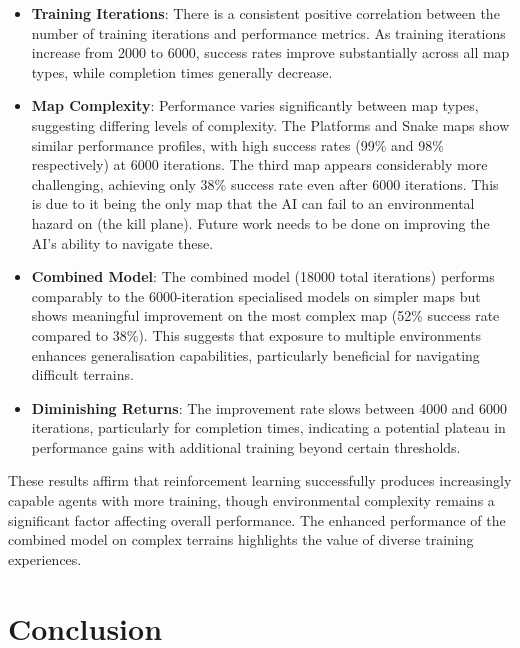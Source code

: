 \begin{itemize}
    \item \textbf{Training Iterations}: There is a consistent positive correlation between the number of training iterations and performance metrics. 
    As training iterations increase from 2000 to 6000, success rates improve substantially across all map types, while completion times generally decrease.

    \item \textbf{Map Complexity}: Performance varies significantly between map types, suggesting differing levels of complexity. 
    The Platforms and Snake maps show similar performance profiles, with high success rates (99\% and 98\% respectively) at 6000 iterations. 
    The third map appears considerably more challenging, achieving only 38\% success rate even after 6000 iterations.
    This is due to it being the only map that the AI can fail to an environmental hazard on (the kill plane).
    Future work needs to be done on improving the AI's ability to navigate these.
    
    \item \textbf{Combined Model}: The combined model (18000 total iterations) performs comparably to the 6000-iteration specialised models on simpler maps but shows meaningful improvement on the most complex map (52\% success rate compared to 38\%). 
    This suggests that exposure to multiple environments enhances generalisation capabilities, particularly beneficial for navigating difficult terrains.
    
    \item \textbf{Diminishing Returns}: The improvement rate slows between 4000 and 6000 iterations, particularly for completion times, indicating a potential plateau in performance gains with additional training beyond certain thresholds.
\end{itemize}

These results affirm that reinforcement learning successfully produces increasingly capable agents with more training, though environmental complexity remains a significant factor affecting overall performance. 
The enhanced performance of the combined model on complex terrains highlights the value of diverse training experiences.

\section{Conclusion}

